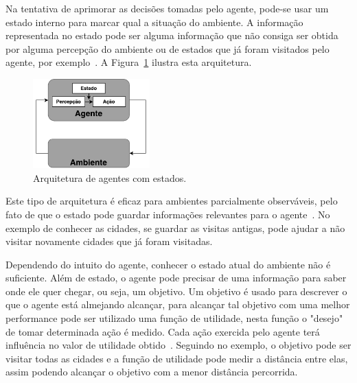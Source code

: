 Na tentativa de aprimorar as decisões tomadas pelo agente, pode-se usar um estado interno para marcar qual a situação do ambiente. A informação representada no estado pode ser alguma informação que não consiga ser obtida por alguma percepção do ambiente ou de estados que já foram visitados pelo agente, por exemplo~\cite[Capítulo 7]{intelligence2003modern}. A Figura~\ref{fig:agenteModelbased} ilustra esta arquitetura. 

\begin{figure}[ht]
	\centering
	\includegraphics[width=0.4\textwidth]{fig/agentModel.pdf}
	\caption{Arquitetura de agentes com estados.}
	\label{fig:agenteModelbased}
\end{figure} 

Este tipo de arquitetura é eficaz para ambientes parcialmente observáveis, pelo fato de que o estado pode guardar informações relevantes para o agente~\cite[Capítulo 7]{intelligence2003modern}. No exemplo de conhecer as cidades, se guardar as visitas antigas, pode ajudar a não visitar novamente cidades que já foram visitadas. 

Dependendo do intuito do agente, conhecer o estado atual do ambiente não é suficiente. Além de estado, o agente pode precisar de uma informação para saber onde ele quer chegar, ou seja, um objetivo. Um objetivo é usado para descrever o que o agente está almejando alcançar, para alcançar tal objetivo com uma melhor performance pode ser utilizado uma função de utilidade, nesta função o "desejo" de tomar determinada ação é medido. Cada ação exercida pelo agente terá influência no valor de utilidade obtido~\cite[Capítulo 7]{intelligence2003modern}. Seguindo no exemplo, o objetivo pode ser visitar todas as cidades e a função de utilidade pode medir a distância entre elas, assim podendo alcançar o objetivo com a menor distância percorrida. 


